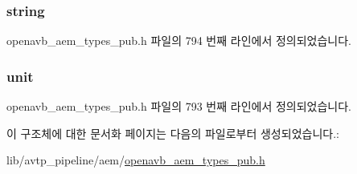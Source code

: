 \subsubsection[{\texorpdfstring{string}{string}}]{ string}\hypertarget{structopenavb__aem__control__value__format__control__linear__int16__t_a1f81001cefa769cb3651172fd5ab0748}{}\label{structopenavb__aem__control__value__format__control__linear__int16__t_a1f81001cefa769cb3651172fd5ab0748}


openavb\+\_\+aem\+\_\+types\+\_\+pub.\+h 파일의 794 번째 라인에서 정의되었습니다.

\subsubsection[{\texorpdfstring{unit}{unit}}]{ unit}\hypertarget{structopenavb__aem__control__value__format__control__linear__int16__t_a0b3ff376c10369016824076deacc055e}{}\label{structopenavb__aem__control__value__format__control__linear__int16__t_a0b3ff376c10369016824076deacc055e}


openavb\+\_\+aem\+\_\+types\+\_\+pub.\+h 파일의 793 번째 라인에서 정의되었습니다.



이 구조체에 대한 문서화 페이지는 다음의 파일로부터 생성되었습니다.\+:\begin{DoxyCompactItemize}
\item 
lib/avtp\+\_\+pipeline/aem/\hyperlink{openavb__aem__types__pub_8h}{openavb\+\_\+aem\+\_\+types\+\_\+pub.\+h}\end{DoxyCompactItemize}
